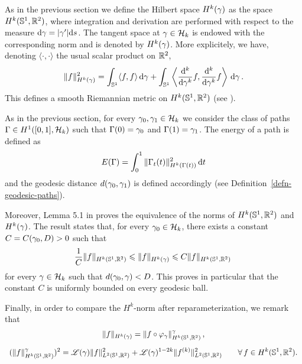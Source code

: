 
As in the previous section we define the Hilbert space $H^k(\gamma)$ as the space $H^k(\mathbb{S}^1,\mathbb{R}^2)$, where integration and derivation are performed with respect to the measure $\mathrm{d} \gamma = |\gamma'| \mathrm{d} s$. 
The tangent space at $\gamma \in \mathcal{H}_k$ is endowed with the corresponding norm and is denoted by $H^k(\gamma)$.
More explicitely, we have, denoting $\langle \cdot, \cdot \rangle$ the usual scalar product on ${\mathbb R}^2$,
\begin{equation}
\| f \|_{H^k(\gamma)}^2 = \int_{\mathbb{S}^1} \langle f, f\rangle \, \mathrm{d}\gamma + \int_{\mathbb{S}^1} \left\langle \frac{\mathrm{d}^k}{\mathrm{d}\gamma^k}f, \frac{\mathrm{d}^k}{\mathrm{d}\gamma^k}f \right\rangle\, \mathrm{d}\gamma\,.
\end{equation}
This defines a smooth Riemannian metric on $H^k(\mathbb{S}^1,\mathbb{R}^2)$ (see \cite{Bruveris}).

As in the previous section, for every $\gamma_0,\gamma_1\in \mathcal{H}_k$ we consider the class of paths $\Gamma \in H^1([0,1],\mathcal{H}_k)$ such that $\Gamma(0)=\gamma_0$ and $\Gamma(1)=\gamma_1$. The energy of a path is defined as  $$E(\Gamma)=\int_0^1 \|\Gamma_t(t)\|_{H^k(\Gamma(t))}^2\,\mathrm{d} t$$ and the geodesic distance $d(\gamma_0,\gamma_1)$ is defined accordingly (see Definition~\ref{defn-geodesic-paths}).

Moreover, Lemma 5.1 in \cite{Bruveris} proves the equivalence of the norms of $H^k(\mathbb{S}^1,\mathbb{R}^2)$ and $H^k(\gamma)$. The result states that, for every $\gamma_0\in \mathcal{H}_k$, there exists a constant $C=C(\gamma_0, D) > 0$ such that 
\begin{equation}\label{bound-sob-norms}
\frac 1 C \| f \|_{H^k(\mathbb{S}^1,\mathbb{R}^2)} \leqslant  \| f \|_{H^k(\gamma)} \leqslant C \| f \|_{H^k(\mathbb{S}^1,\mathbb{R}^2)}\,
\end{equation}
for every $\gamma \in \mathcal{H}_k$ such that $d(\gamma_0,\gamma)< D$. This proves in particular that the constant $C$ is uniformly bounded on every geodesic ball. 

Finally, in order to compare the $H^k$-norm after reparameterization, we remark that 
\begin{equation}\label{change-sob}
\begin{array}{c} 
\displaystyle{ 
\| f \|_{\hsg} = \| f\circ\varphi_\gm \|_{\hs}^{\gm}}\,, \vspace{0.3cm}\\
\displaystyle{(\| f \|_{\hs}^{\gm})^2 = \len(\gm)\| f \|^2_{\leb{2}} +  \len(\gm)^{1 - 2k}\|f^{(k)}\|^2_{\leb{2}} \quad \quad \forall \, f\in \hs.}
\end{array}
\end{equation}

